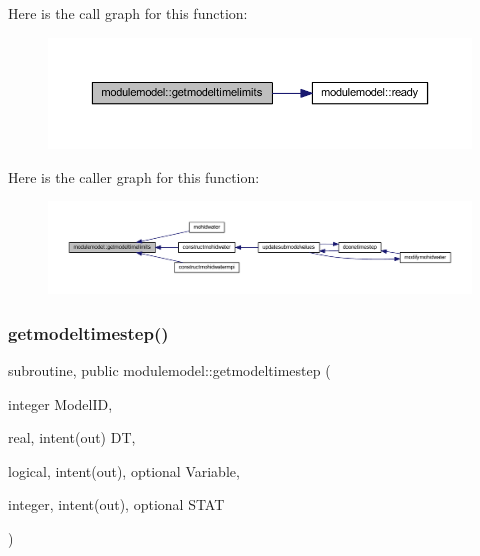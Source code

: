 Here is the call graph for this function\+:\nopagebreak
\begin{figure}[H]
\begin{center}
\leavevmode
\includegraphics[width=350pt]{namespacemodulemodel_a4273c6982391135a62686fbcf6a0861c_cgraph}
\end{center}
\end{figure}
Here is the caller graph for this function\+:\nopagebreak
\begin{figure}[H]
\begin{center}
\leavevmode
\includegraphics[width=350pt]{namespacemodulemodel_a4273c6982391135a62686fbcf6a0861c_icgraph}
\end{center}
\end{figure}
\mbox{\label{namespacemodulemodel_a548beb7d8ae7799facee13efde759d64}} 
\subsubsection{\texorpdfstring{getmodeltimestep()}{getmodeltimestep()}}
{\footnotesize\ttfamily subroutine, public modulemodel\+::getmodeltimestep (\begin{DoxyParamCaption}\item[{integer}]{Model\+ID,  }\item[{real, intent(out)}]{DT,  }\item[{logical, intent(out), optional}]{Variable,  }\item[{integer, intent(out), optional}]{S\+T\+AT }\end{DoxyParamCaption})}

